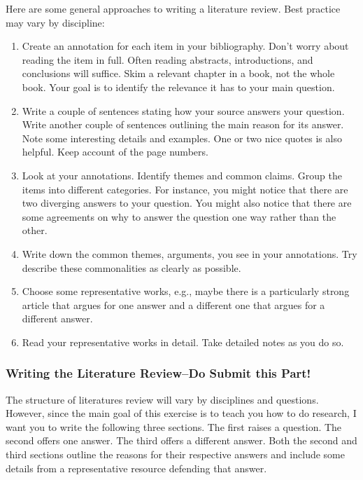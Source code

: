 \documentclass[oneside]{article}
\begin{document}
Here are some general approaches to writing a literature review. Best
practice may vary by discipline:

\begin{enumerate}
\def\labelenumi{\arabic{enumi}.}
\item
  Create an annotation for each item in your bibliography. Don't worry
  about reading the item in full. Often reading abstracts,
  introductions, and conclusions will suffice. Skim a relevant chapter
  in a book, not the whole book. Your goal is to identify the relevance
  it has to your main question.
\item
  Write a couple of sentences stating how your source answers your
  question. Write another couple of sentences outlining the main reason
  for its answer. Note some interesting details and examples. One or two
  nice quotes is also helpful. Keep account of the page numbers.
\item
  Look at your annotations. Identify themes and common claims. Group the
  items into different categories. For instance, you might notice that
  there are two diverging answers to your question. You might also
  notice that there are some agreements on why to answer the question
  one way rather than the other.
\item
  Write down the common themes, arguments, you see in your annotations.
  Try describe these commonalities as clearly as possible.
\item
  Choose some representative works, e.g., maybe there is a particularly
  strong article that argues for one answer and a different one that
  argues for a different answer.
\item
  Read your representative works in detail. Take detailed notes as you
  do so.
\end{enumerate}

\subsubsection{Writing the Literature Review--Do Submit this
Part!}\label{writing-the-literature-reviewdo-submit-this-part}

The structure of literatures review will vary by disciplines and
questions. However, since the main goal of this exercise is to teach you
how to do research, I want you to write the following three sections.
The first raises a question. The second offers one answer. The third
offers a different answer. Both the second and third sections outline
the reasons for their respective answers and include some details from a
representative resource defending that answer.
\end{document}
